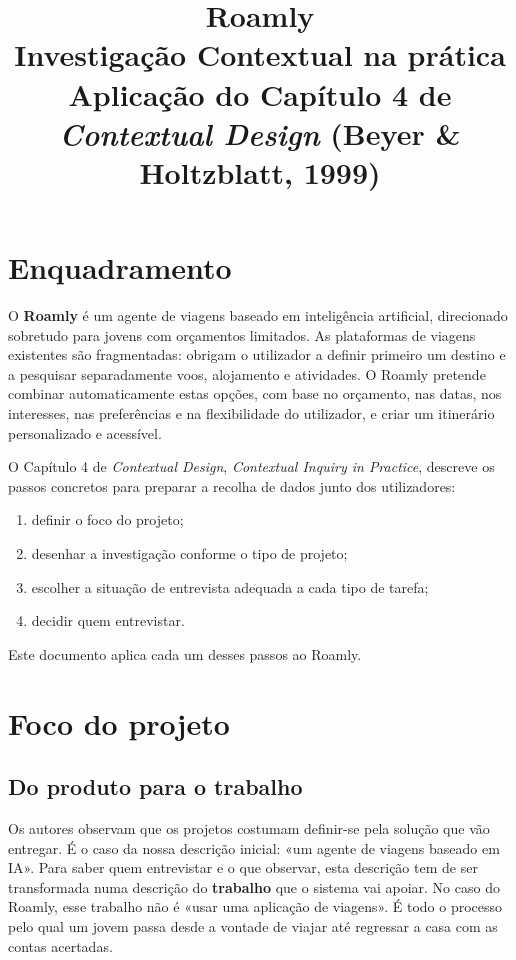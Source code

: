 \documentclass[11pt,a4paper]{article}
\title{\textbf{Roamly}\\[4pt]\large Investigação Contextual na prática\\
\normalsize Aplicação do Capítulo 4 de \textit{Contextual Design} (Beyer \& Holtzblatt, 1999)}
\author{}
\date{}
\begin{document}
\maketitle

\section{Enquadramento}

O \textbf{Roamly} é um agente de viagens baseado em inteligência artificial, direcionado sobretudo para jovens com orçamentos limitados. As plataformas de viagens existentes são fragmentadas: obrigam o utilizador a definir primeiro um destino e a pesquisar separadamente voos, alojamento e atividades. O Roamly pretende combinar automaticamente estas opções, com base no orçamento, nas datas, nos interesses, nas preferências e na flexibilidade do utilizador, e criar um itinerário personalizado e acessível.

O Capítulo 4 de \textit{Contextual Design}, \textit{Contextual Inquiry in Practice}, descreve os passos concretos para preparar a recolha de dados junto dos utilizadores:
\begin{enumerate}[nosep]
  \item definir o foco do projeto;
  \item desenhar a investigação conforme o tipo de projeto;
  \item escolher a situação de entrevista adequada a cada tipo de tarefa;
  \item decidir quem entrevistar.
\end{enumerate}
Este documento aplica cada um desses passos ao Roamly.

\section{Foco do projeto}

\subsection{Do produto para o trabalho}

Os autores observam que os projetos costumam definir-se pela solução que vão entregar. É o caso da nossa descrição inicial: «um agente de viagens baseado em IA». Para saber quem entrevistar e o que observar, esta descrição tem de ser transformada numa descrição do \textbf{trabalho} que o sistema vai apoiar. No caso do Roamly, esse trabalho não é «usar uma aplicação de viagens». É todo o processo pelo qual um jovem passa desde a vontade de viajar até regressar a casa com as contas acertadas.
\end{document}

